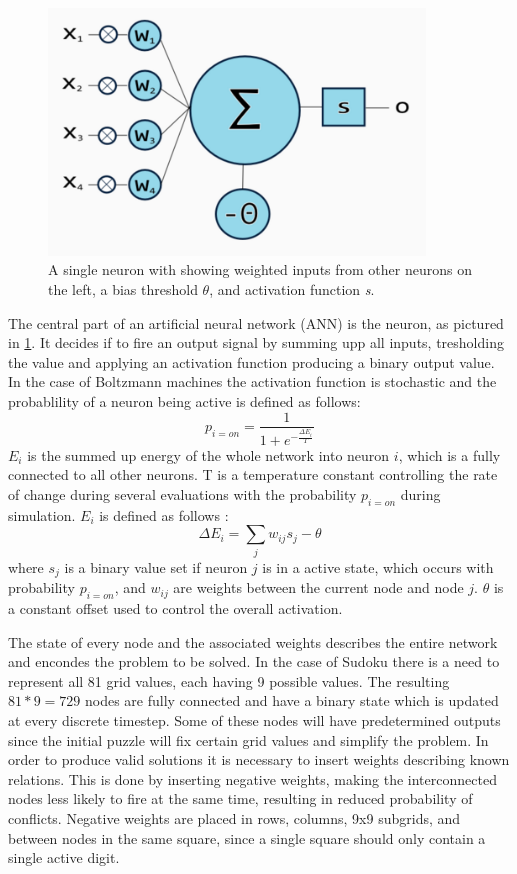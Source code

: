 \documentclass[a4paper,11pt]{kth-mag}
\begin{document}
\begin{figure}[here] 
\centering
\includegraphics[width=10cm]{images/neuron.png}
\caption{A single neuron with showing weighted inputs from other neurons on the left, a bias threshold $\theta$, and activation function \emph{s}.}
\label{fig:neural-Neuron}
\end{figure}
The central part of an artificial neural network (ANN) is the neuron, as pictured in \ref{fig:neural-Neuron}.
It decides if to fire an output signal by summing upp all inputs, tresholding the value and applying an activation function producing a binary output value.
In the case of Boltzmann machines the activation function is stochastic and the probablility of a neuron being active is defined as follows:
\[
p_{i=on} = \frac{1}{1+e^{-\frac{\Delta E_{i}}{T}}}
\]
$E_i$ is the summed up energy of the whole network into neuron $i$, which is a fully connected to all other neurons.
T is a temperature constant controlling the rate of change during several evaluations with the probability $p_{i=on}$ during simulation.
$E_i$ is defined as follows \cite{boltzmann2}:
\[
\Delta E_{i} = \sum_{j} w_{ij} s_{j} - \theta
\]
where $s_j$ is a binary value set if neuron $j$ is in a active state, which occurs with probability $p_{i=on}$, and $w_{ij}$ are weights between the current node and node $j$. $\theta$ is a constant offset used to control the overall activation.

The state of every node and the associated weights describes the entire network and encondes the problem to be solved.
In the case of Sudoku there is a need to represent all 81 grid values, each having 9 possible values.
The resulting $81*9=729$ nodes are fully connected and have a binary state which is updated at every discrete timestep.
Some of these nodes will have predetermined outputs since the initial puzzle will fix certain grid values and simplify the problem.
In order to produce valid solutions it is necessary to insert weights describing known relations.
This is done by inserting negative weights, making the interconnected nodes less likely to fire at the same time, resulting in reduced probability of conflicts.
Negative weights are placed in rows, columns, 9x9 subgrids, and between nodes in the same square, since a single square should only contain a single active digit.\\
\end{document}
